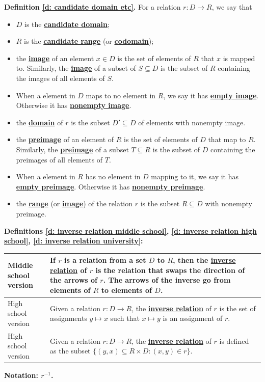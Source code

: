 \documentclass[11pt]{article}
\renewcommand\subset\subseteq
\newcommand\st{:}
\renewcommand\emph[1]{\underline{\bf{#1}}} %
\theoremstyle{definition}
\begin{document}
\vfill 
{\bf Definition \ref{d: candidate domain etc}.} 
For a relation $r:D \to R$, we say that 
\vspace*{-4pt}
\begin{itemize}
	\item $D$ is the \emph{candidate domain};
	\item $R$ is the \emph{candidate range} (or \emph{codomain});
	\item the \emph{image} of an element $x\in  D$ is the set of elements of $R$ that $x$ is mapped to. Similarly, the \emph{image} of a subset of $S\subset D$ is the subset of $R$ containing the images of all elements of $S$.
	\item When a element in $D$ maps to no element in $R$, we say it has \emph{empty image}. Otherwise it has \emph{nonempty image}.
	\item the \emph{domain} of $r$ is the subset $D'\subset D$ of elements with nonempty image.
	\item the \emph{preimage} of an element of $R$ is the set of elements of $D$ that map to $R$. Similarly, the \emph{preimage} of a subset $T\subset R$ is the subset of $D$ containing the preimages of all elements of $T$.
	\item When a element in $R$ has no element in $D$ mapping to it, we say it has \emph{empty preimage}. Otherwise it has \emph{nonempty preimage}.
	\item the \emph{range} (or \emph{image}) of the relation $r$ is the subset $R\subset D$ with nonempty preimage.
	\end{itemize}

\vfill 

{\bf Definitions \ref{d: inverse relation middle school}, \ref{d: inverse relation high school}, \ref{d: inverse relation university}:}  \\ 
\begin{tabular}{L{1.25in}|L{5in}}
\hline 
Middle school version & 
If $r$ is a relation from a set $D$ to $R$, then the \emph{inverse relation} of $r$ is the relation that swaps the direction of the arrows of $r$.  The arrows of the inverse go from elements of $R$ to elements of $D$. \\ \hline 
High school version & 
Given a relation $r:D\to R$, the \emph{inverse relation} of $r$ is the set of assignments $y\mapsto x$ such that $x\mapsto y$ is an assignment of $r$. \\ \hline  
High school version & 
Given a relation $r:D\to R$, the \emph{inverse relation} of $r$ is defined as the subset 
	$\{(y, x) \subset R\times D \st (x,y)\in r\}.$\\ \hline
\end{tabular}
{\bf Notation: $r^{-1}$.}
\end{document}
